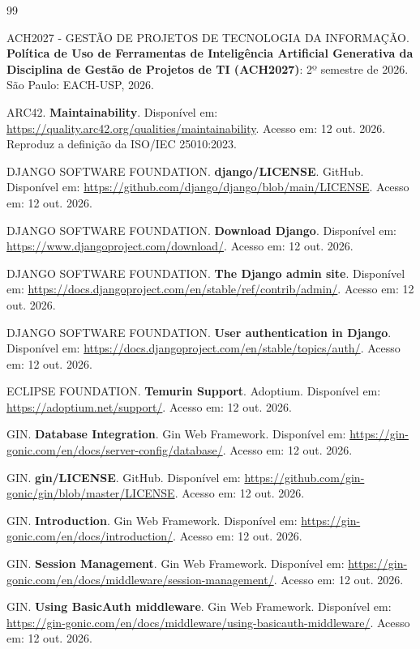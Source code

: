 \documentclass[a4paper]{article}
\begin{document}
\begin{thebibliography}{99}

ACH2027 - GESTÃO DE PROJETOS DE TECNOLOGIA DA INFORMAÇÃO. \textbf{Política de Uso de Ferramentas de Inteligência Artificial Generativa da Disciplina de Gestão de Projetos de TI (ACH2027)}: 2º semestre de 2026. São Paulo: EACH-USP, 2026.

ARC42. \textbf{Maintainability}. Disponível em: \url{https://quality.arc42.org/qualities/maintainability}. Acesso em: 12 out. 2026. Reproduz a definição da ISO/IEC 25010:2023.

DJANGO SOFTWARE FOUNDATION. \textbf{django/LICENSE}. GitHub. Disponível em: \url{https://github.com/django/django/blob/main/LICENSE}. Acesso em: 12 out. 2026.

DJANGO SOFTWARE FOUNDATION. \textbf{Download Django}. Disponível em: \url{https://www.djangoproject.com/download/}. Acesso em: 12 out. 2026.

DJANGO SOFTWARE FOUNDATION. \textbf{The Django admin site}. Disponível em: \url{https://docs.djangoproject.com/en/stable/ref/contrib/admin/}. Acesso em: 12 out. 2026.

DJANGO SOFTWARE FOUNDATION. \textbf{User authentication in Django}. Disponível em: \url{https://docs.djangoproject.com/en/stable/topics/auth/}. Acesso em: 12 out. 2026.

ECLIPSE FOUNDATION. \textbf{Temurin Support}. Adoptium. Disponível em: \url{https://adoptium.net/support/}. Acesso em: 12 out. 2026.

GIN. \textbf{Database Integration}. Gin Web Framework. Disponível em: \url{https://gin-gonic.com/en/docs/server-config/database/}. Acesso em: 12 out. 2026.

GIN. \textbf{gin/LICENSE}. GitHub. Disponível em: \url{https://github.com/gin-gonic/gin/blob/master/LICENSE}. Acesso em: 12 out. 2026.

GIN. \textbf{Introduction}. Gin Web Framework. Disponível em: \url{https://gin-gonic.com/en/docs/introduction/}. Acesso em: 12 out. 2026.

GIN. \textbf{Session Management}. Gin Web Framework. Disponível em: \url{https://gin-gonic.com/en/docs/middleware/session-management/}. Acesso em: 12 out. 2026.

GIN. \textbf{Using BasicAuth middleware}. Gin Web Framework. Disponível em: \url{https://gin-gonic.com/en/docs/middleware/using-basicauth-middleware/}. Acesso em: 12 out. 2026.


\end{thebibliography}
\end{document}
